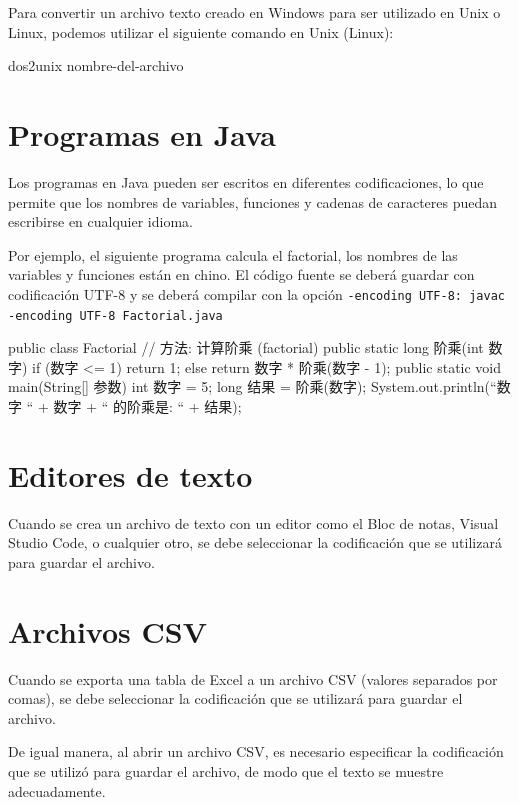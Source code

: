 \documentclass[11pt,a4paper,oneside]{book}
\begin{document}
Para convertir un archivo texto creado en Windows para ser utilizado en Unix o Linux, podemos utilizar el siguiente comando en Unix (Linux):

\begin{SourceCode}
dos2unix nombre-del-archivo
\end{SourceCode}

\section{Programas en Java}

Los programas en Java pueden ser escritos en diferentes codificaciones, lo que permite que los nombres de variables, funciones y cadenas de caracteres puedan escribirse en cualquier idioma.

Por ejemplo, el siguiente programa calcula el factorial, los nombres de las variables y funciones están en chino. El código fuente se deberá guardar con codificación UTF-8 y se deberá compilar con la opción \texttt{-encoding UTF-8: javac -encoding UTF-8 Factorial.java}

\begin{SourceCode}
public class Factorial
{
    // 方法: 计算阶乘 (factorial)
    public static long 阶乘(int 数字)
    {
        if (数字 <= 1)
            return 1;
        else
            return 数字 * 阶乘(数字 - 1);
    }
    public static void main(String[] 参数)
    {
        int 数字 = 5;
        long 结果 = 阶乘(数字);
        System.out.println(``数字 `` + 数字 + `` 的阶乘是: `` + 结果);
    }
}
\end{SourceCode}

\section{Editores de texto}

Cuando se crea un archivo de texto con un editor como el Bloc de notas, Visual Studio Code, o cualquier otro, se debe seleccionar la codificación que se utilizará para guardar el archivo.

\section{Archivos CSV}

Cuando se exporta una tabla de Excel a un archivo CSV (valores separados por comas), se debe seleccionar la codificación que se utilizará para guardar el archivo.

De igual manera, al abrir un archivo CSV, es necesario especificar la codificación que se utilizó para guardar el archivo, de modo que el texto se muestre adecuadamente.
\end{document}
